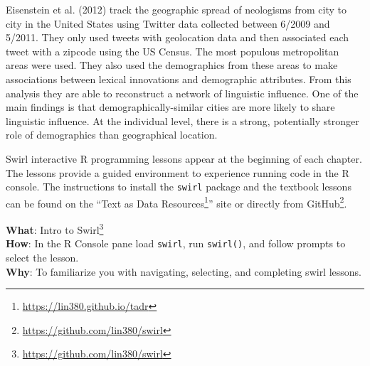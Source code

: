 \documentclass[
  letterpaper,
]{scrbook}
\DeclareRobustCommand{\href}[2]{#2\footnote{\url{#1}}}
\begin{document}
\begin{tcolorbox}[enhanced jigsaw, title=\textcolor{quarto-callout-caution-color}{\faFire}\hspace{0.5em}{Case study}, titlerule=0mm, toptitle=1mm, colbacktitle=quarto-callout-caution-color!10!white, bottomtitle=1mm, left=2mm, colframe=quarto-callout-caution-color-frame, breakable, toprule=.15mm, colback=white, opacitybacktitle=0.6, leftrule=.75mm, rightrule=.15mm, bottomrule=.15mm, arc=.35mm, coltitle=black, opacityback=0]

Eisenstein et al. (2012) track the geographic spread of neologisms from
city to city in the United States using Twitter data collected between
6/2009 and 5/2011. They only used tweets with geolocation data and then
associated each tweet with a zipcode using the US Census. The most
populous metropolitan areas were used. They also used the demographics
from these areas to make associations between lexical innovations and
demographic attributes. From this analysis they are able to reconstruct
a network of linguistic influence. One of the main findings is that
demographically-similar cities are more likely to share linguistic
influence. At the individual level, there is a strong, potentially
stronger role of demographics than geographical location.

\end{tcolorbox}

Swirl interactive R programming lessons appear at the beginning of each
chapter. The lessons provide a guided environment to experience running
code in the R console. The instructions to install the \texttt{swirl}
package and the textbook lessons can be found on the
``\href{https://lin380.github.io/tadr}{Text as Data Resources}'' site or
directly from \href{https://github.com/lin380/swirl}{GitHub}.

\begin{tcolorbox}[enhanced jigsaw, title=\textcolor{quarto-callout-tip-color}{\faLightbulb}\hspace{0.5em}{Swirl}, titlerule=0mm, toptitle=1mm, colbacktitle=quarto-callout-tip-color!10!white, bottomtitle=1mm, left=2mm, colframe=quarto-callout-tip-color-frame, breakable, toprule=.15mm, colback=white, opacitybacktitle=0.6, leftrule=.75mm, rightrule=.15mm, bottomrule=.15mm, arc=.35mm, coltitle=black, opacityback=0]

\textbf{What}: \href{https://github.com/lin380/swirl}{Intro to Swirl}\\
\textbf{How}: In the R Console pane load \texttt{swirl}, run
\texttt{swirl()}, and follow prompts to select the lesson.\\
\textbf{Why}: To familiarize you with navigating, selecting, and
completing swirl lessons.

\end{tcolorbox}
\end{document}
